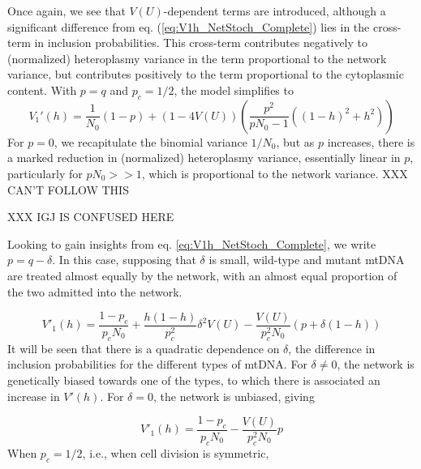 \documentclass{article}
\begin{document}
\begin{appendices}
Once again, we see that $V(U)$-dependent terms are introduced, although a significant difference from eq. (\ref{eq:V1h_NetStoch_Complete}) lies in the cross-term in inclusion probabilities. This cross-term contributes negatively to (normalized) heteroplasmy variance in the term proportional to the network variance, but contributes positively to the term proportional to the cytoplasmic content. With $p = q$ and $p_c = 1/2$, the model simplifies to
\begin{equation}
    V_1'(h) = \frac{1}{N_0}(1-p)+(1-4V(U))\left(\frac{p^2}{pN_0-1}((1-h)^2+h^2)\right)
\end{equation}
For $p=0$, we recapitulate the binomial variance $1/N_0$, but as $p$ increases, there is a marked reduction in (normalized) heteroplasmy variance, essentially linear in $p$, particularly for $pN_0>>1$, which is proportional to the network variance. XXX CAN'T FOLLOW THIS

XXX IGJ IS CONFUSED HERE

Looking to gain insights from eq. \ref{eq:V1h_NetStoch_Complete}, we write $p = q-\delta$. In this case, supposing that $\delta$ is small, wild-type and mutant mtDNA are treated almost equally by the network, with an almost equal proportion of the two admitted into the network.

\begin{equation}
V'_1(h) = \frac{1-p_c}{p_c N_0}
        +\frac{h(1-h)}{p_c^2}\delta^2V(U)
        -\frac{V(U)}{p_c^2N_0}(p+\delta (1-h))
\end{equation}
It will be seen that there is a quadratic dependence on $\delta$, the difference in inclusion probabilities for the different types of mtDNA. For $\delta\neq 0$, the network is genetically biased towards one of the types, to which there is associated an increase in $V'(h)$. For $\delta=0$, the network is unbiased, giving

\begin{equation}
V'_1(h) = \frac{1-p_c}{p_c N_0}
        -\frac{V(U)}{p_c^2N_0}p
\end{equation}
When $p_c=1/2$, i.e., when cell division is symmetric,


\end{appendices}
\end{document}
